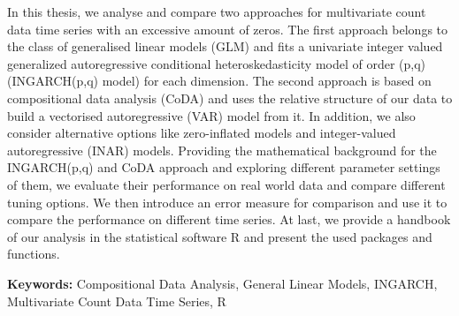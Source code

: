 In this thesis, we analyse and compare two approaches for multivariate count data time series with an excessive amount of zeros. The first approach belongs to the class of generalised linear models (GLM) and fits a univariate integer valued generalized autoregressive conditional heteroskedasticity model of order (p,q) (INGARCH(p,q) model) for each dimension. The second approach is based on compositional data analysis (CoDA) and uses the relative structure of our data to build a vectorised autoregressive (VAR) model from it. In addition, we also consider alternative options like zero-inflated models and integer-valued autoregressive (INAR) models. Providing the mathematical background for the INGARCH(p,q) and CoDA approach and exploring different parameter settings of them, we evaluate their performance on real world data and compare different tuning options. We then introduce an error measure for comparison and use it to compare the performance on different time series. At last, we provide a handbook of our analysis in the statistical software R and present the used packages and functions. \newline

\textbf{Keywords:} Compositional Data Analysis, General Linear Models, INGARCH, Multivariate Count Data Time Series, R